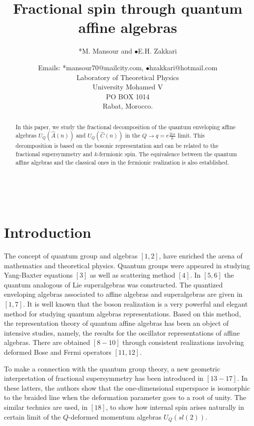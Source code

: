\documentclass[a4paper,12pt,thmsa]{article}
\begin{document}
\title{Fractional spin through quantum affine algebras }
\author{*M. Mansour and $\bullet $E.H. Zakkari \and Emails: *mansour70@mailcity.com,
$\bullet $hzakkari@hotmail.com \\
Laboratory of Theoretical Physics\\
University Mohamed V\\
PO BOX 1014\\
Rabat, Morocco.}
\date{}
\maketitle

\begin{abstract}
In this paper, we study the fractional decomposition of the quantum
enveloping affine algebras $U_Q(\hat A(n))$ and $U_Q(\widehat{C}(n))$ in the
$Q\rightarrow q=e\frac{2i\pi }k$ limit. This decomposition is based on the
bosonic representation and can be related to the fractional supersymmetry
and $k$-fermionic spin. The equivalence between the quantum affine algebras
and the classical ones in the fermionic realization is also established.
\end{abstract}

\newpage\

\section{Introduction}

The concept of quantum group and algebras $[1,2]$, have enriched the arena
of mathematics and theoretical physics. Quantum groups were appeared in
studying Yang-Baxter equations $[3]$ as well as scattering method $[4]$. In $%
[5,6]$ the quantum analogous of Lie superalgebras was constructed. The
quantized enveloping algebras associated to affine algebras and
superalgebras are given in $[1,7]$. It is well known that the boson
realization is a very powerful and elegant method for studying quantum
algebras representations. Based on this method, the representation theory of
quantum affine algebras has been an object of intensive studies, namely, the
results for the oscillator representations of affine algebras. There are
obtained $[8-10]$ through consistent realizations involving deformed Bose
and Fermi operators $[11,12]$.

To make a connection with the quantum group theory, a new geometric
interpretation of fractional supersymmetry has been introduced in $[13-17]$.
In these latters, the authors show that the one-dimensional superspace is
isomorphic to the braided line when the deformation parameter goes to a root
of unity. The similar technics are used, in $[18]$, to show how internal
spin arises naturally in certain limit of the $Q$-deformed momentum algebras
$U_Q(sl(2))$.
\end{document}
